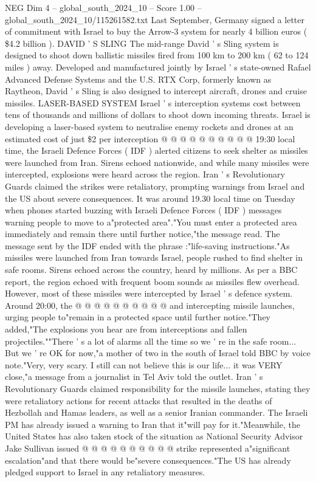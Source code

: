 \begin{textsample}{NEG Dim 4 – global\_south\_2024\_10 – Score 1.00 – global\_south\_2024\_10/115261582.txt}
Last September, Germany signed a letter of commitment with Israel to buy the Arrow-3 system for nearly 4 billion euros ( \$4.2 billion ).
DAVID ' S SLING The mid-range David ' s Sling system is designed to shoot down ballistic missiles fired from 100 km to 200 km ( 62 to 124 miles ) away.
Developed and manufactured jointly by Israel ' s state-owned Rafael Advanced Defense Systems and the U.S.
RTX Corp, formerly known as Raytheon, David ' s Sling is also designed to intercept aircraft, drones and cruise missiles.
LASER-BASED SYSTEM Israel ' s interception systems cost between tens of thousands and millions of dollars to shoot down incoming threats.
Israel is developing a laser-based system to neutralise enemy rockets and drones at an estimated cost of just \$2 per interception @ @ @ @ @ @ @ @ @ @ 19:30 local time, the Israeli Defence Forces ( IDF ) alerted citizens to seek shelter as missiles were launched from Iran.
Sirens echoed nationwide, and while many missiles were intercepted, explosions were heard across the region.
Iran ' s Revolutionary Guards claimed the strikes were retaliatory, prompting warnings from Israel and the US about severe consequences.
It was around 19.30 local time on Tuesday when phones started buzzing with Israeli Defence Forces ( IDF ) messages warning people to move to a"protected area"."You must enter a protected area immediately and remain there until further notice,"the message read.
The message sent by the IDF ended with the phrase :"life-saving instructions."As missiles were launched from Iran towards Israel, people rushed to find shelter in safe rooms.
Sirens echoed across the country, heard by millions.
As per a BBC report, the region echoed with frequent boom sounds as missiles flew overhead.
However, most of these missiles were intercepted by Israel ' s defence system.
Around 20:00, the @ @ @ @ @ @ @ @ @ @ and intercepting missile launches, urging people to"remain in a protected space until further notice."They added,"The explosions you hear are from interceptions and fallen projectiles.""There ' s a lot of alarms all the time so we ' re in the safe room...
But we ' re OK for now,"a mother of two in the south of Israel told BBC by voice note."Very, very scary.
I still can not believe this is our life... it was VERY close,"a message from a journalist in Tel Aviv told the outlet.
Iran ' s Revolutionary Guards claimed responsibility for the missile launches, stating they were retaliatory actions for recent attacks that resulted in the deaths of Hezbollah and Hamas leaders, as well as a senior Iranian commander.
The Israeli PM has already issued a warning to Iran that it"will pay for it."Meanwhile, the United States has also taken stock of the situation as National Security Advisor Jake Sullivan issued @ @ @ @ @ @ @ @ @ @ strike represented a"significant escalation"and that there would be"severe consequences."The US has already pledged support to Israel in any retaliatory measures.

\end{textsample}
